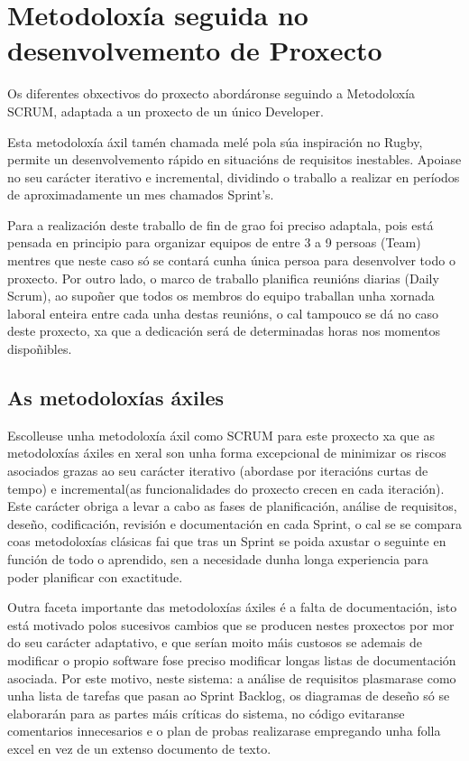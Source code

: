 \chapter{Metodoloxía seguida no desenvolvemento de Proxecto}

Os diferentes obxectivos do proxecto abordáronse seguindo a Metodoloxía SCRUM, adaptada a
un proxecto de un único Developer.

Esta metodoloxía áxil tamén chamada melé pola súa inspiración no Rugby, permite un
desenvolvemento rápido en situacións de requisitos inestables. Apoiase no seu carácter 
iterativo e incremental, dividindo o traballo a realizar en períodos de aproximadamente un mes
chamados Sprint's.

Para a realización deste traballo de fin de grao foi preciso adaptala, pois está pensada en 
principio para organizar equipos de entre 3 a 9 persoas (Team) mentres que neste caso só se contará 
cunha única persoa para desenvolver todo o proxecto. Por outro lado, o marco de 
traballo planifica reunións diarias (Daily Scrum), ao supoñer que todos os membros do equipo 
traballan unha xornada laboral enteira entre cada unha destas reunións, o cal tampouco se dá 
no caso deste proxecto, xa que a dedicación será de determinadas horas nos momentos dispoñibles.

\section{As metodoloxías áxiles}
    Escolleuse unha metodoloxía áxil como SCRUM para este proxecto xa que as metodoloxías áxiles en
    xeral son unha forma excepcional de minimizar os riscos asociados grazas ao seu carácter 
    iterativo (abordase por iteracións curtas de tempo) e incremental(as funcionalidades do proxecto
    crecen en cada iteración). Este carácter obriga a levar a cabo as fases de planificación, análise 
    de requisitos, deseño, codificación, revisión e documentación en cada Sprint, o cal se se 
    compara coas metodoloxías clásicas fai que tras un Sprint se poida axustar o seguinte en función
    de todo o aprendido, sen a necesidade dunha longa experiencia para poder planificar con 
    exactitude.
    
    Outra faceta importante das metodoloxías áxiles é a falta de documentación, isto está motivado 
    polos sucesivos cambios que se producen nestes proxectos por mor do seu carácter adaptativo, e 
    que serían moito máis custosos se ademais de modificar o propio software fose preciso modificar
    longas listas de documentación asociada. Por este motivo, neste sistema: a análise de requisitos 
    plasmarase como unha lista de tarefas que pasan ao Sprint Backlog, os diagramas de deseño só se 
    elaborarán para as partes máis críticas do sistema, no código evitaranse comentarios 
    innecesarios e o plan de probas realizarase empregando unha folla excel en vez de un extenso 
    documento de texto.


